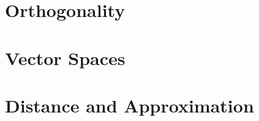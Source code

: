   \chapter{Orthogonality}
    
    
    
    
    

  \chapter{Vector Spaces}
    
    
    
    
    
    
    

  \chapter{Distance and Approximation}
    
    
    
    
    



